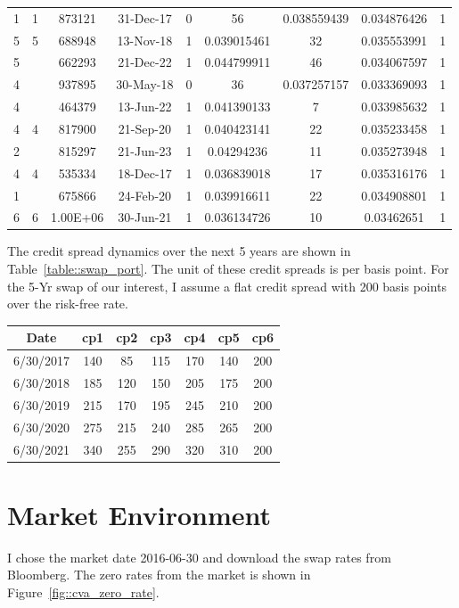 \begin{center}
{\begin{tabular}{|c|c|c|c|c|c|c|c|c|}
1	&	1	&	873121	&	31-Dec-17	&	0	&	56	&	0.038559439	&	0.034876426	&	1	\\
5	&	5	&	688948	&	13-Nov-18	&	1	&	0.039015461	&	32	&	0.035553991	&	1	\\
5	&		&	662293	&	21-Dec-22	&	1	&	0.044799911	&	46	&	0.034067597	&	1	\\
4	&		&	937895	&	30-May-18	&	0	&	36	&	0.037257157	&	0.033369093	&	1	\\
4	&		&	464379	&	13-Jun-22	&	1	&	0.041390133	&	7	&	0.033985632	&	1	\\
4	&	4	&	817900	&	21-Sep-20	&	1	&	0.040423141	&	22	&	0.035233458	&	1	\\
2	&		&	815297	&	21-Jun-23	&	1	&	0.04294236	&	11	&	0.035273948	&	1	\\
4	&	4	&	535334	&	18-Dec-17	&	1	&	0.036839018	&	17	&	0.035316176	&	1	\\
1	&		&	675866	&	24-Feb-20	&	1	&	0.039916611	&	22	&	0.034908801	&	1	\\
6	&	6	&	1.00E+06	&	30-Jun-21	&	1	&	0.036134726	&	10	&	0.03462651	&	1	\\
  \hline
\end{tabular}}\label{table::swap_port}
\end{center}

The credit spread dynamics over the next 5 years are shown in Table~\ref{table::swap_port}. The unit of these credit spreads is per basis point. For the 5-Yr swap of our interest, I assume a flat credit spread with 200 basis points over the risk-free rate.

\begin{center}
\begin{tabular}{|c|c|c|c|c|c|c|} 
  \hline
Date	&	cp1	&	cp2	&	cp3	&	cp4	&	cp5	&	cp6	\\ \hline
6/30/2017	&	140	&	85	&	115	&	170	&	140	&	200	\\
6/30/2018	&	185	&	120	&	150	&	205	&	175	&	200	\\
6/30/2019	&	215	&	170	&	195	&	245	&	210	&	200	\\
6/30/2020	&	275	&	215	&	240	&	285	&	265	&	200	\\
6/30/2021	&	340	&	255	&	290	&	320	&	310	&	200	\\
  \hline
\end{tabular}\label{table::credit_spread}
\end{center}

\section{Market Environment}
I chose the market date 2016-06-30 and download the swap rates from Bloomberg. The zero rates from the market is shown in Figure~\ref{fig::cva_zero_rate}. 

